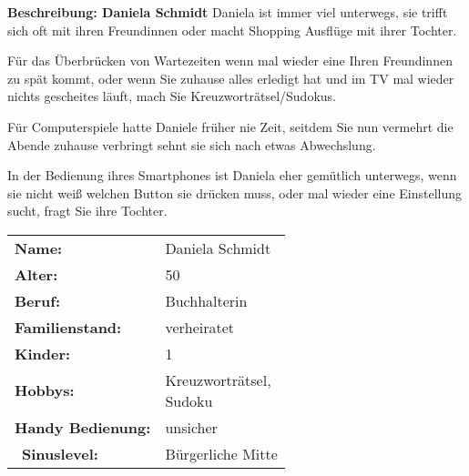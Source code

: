 \documentclass[12pt, a4paper]{article}
\begin{document}
\begin{flushleft}
\newpage
\textbf{Beschreibung: Daniela Schmidt}\newline
Daniela ist immer viel unterwegs, sie trifft sich oft mit ihren Freundinnen oder macht Shopping Ausflüge mit ihrer Tochter.\newline

Für das Überbrücken von Wartezeiten wenn mal wieder eine Ihren Freundinnen zu spät kommt, oder wenn Sie zuhause alles erledigt hat und im TV mal wieder nichts gescheites läuft, mach Sie Kreuzworträtsel/Sudokus.\newline

Für Computerspiele hatte Daniele früher nie Zeit, seitdem Sie nun vermehrt die Abende zuhause verbringt sehnt sie sich nach etwas Abwechslung.\newline

In der Bedienung ihres Smartphones ist Daniela eher gemütlich unterwegs, wenn sie nicht weiß welchen Button sie drücken muss, oder mal wieder eine Einstellung sucht, fragt Sie ihre Tochter.\newline

\par\bigskip

\begin{table}[H]
\begin{center}
\begin{tabular}[h]{|l l|}
\hline
\textbf{Name:} & Daniela Schmidt\\
\textbf{Alter:} & 50\\
\textbf{Beruf:} & Buchhalterin\\
\textbf{Familienstand:} & verheiratet\\
\textbf{Kinder:} & 1\\
\textbf{Hobbys:} & \makecell[l]{ Kreuzworträtsel,\\ Sudoku\\}\\
\textbf{Handy Bedienung:} & unsicher\\\
\textbf{Sinuslevel:} & Bürgerliche Mitte\\
\hline
\end{tabular}
\end{center}
\end{table}

\end{flushleft}

\newpage
\end{document}
